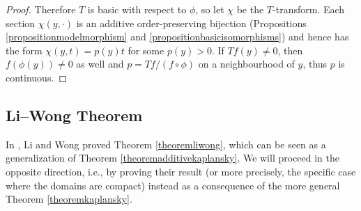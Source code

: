 \begin{proof}
Therefore $T$ is basic with respect to $\phi$, so let $\chi$ be the $T$-transform. Each section $\chi(y,\cdot)$ is an additive order-preserving bijection (Propositions \ref{propositionmodelmorphism} and \ref{propositionbasicisomorphisms}) and hence has the form $\chi(y,t)=p(y)t$ for some $p(y)>0$. If $Tf(y)\neq 0$, then $f(\phi(y))\neq 0$ as well and $p=Tf/(f\circ \phi)$ on a neighbourhood of $y$, thus $p$ is continuous.\qedhere
%
\end{proof}


\subsection{Li--Wong Theorem}\label{subsectionliwong}


In \cite{MR3162258}, Li and Wong proved Theorem \ref{theoremliwong}, which can be seen as a generalization of Theorem \ref{theoremadditivekaplansky}. We will proceed in the opposite direction, i.e., by proving their result (or more precisely, the specific case where the domains are compact) instead as a consequence of the more general Theorem \ref{theoremkaplansky}.

